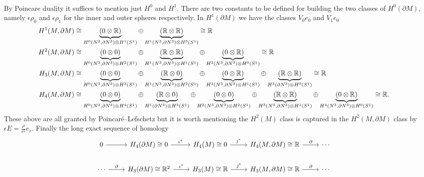 \documentclass{article}
\begin{document}
\begin{example}
\begin{itemize}
\begin{itemize}
\begin{align*}
\end{align*}
By Poincare duality it suffices to mention just $H^0$ and $H^1$. There are two constants to be defined for building the two classes of $H^0(\partial M)$, namely $\epsilon \rho_0$ and $\epsilon \rho_1$ for the inner and outer spheres respectively. In $H^1(\partial M)$ we have the classes $V_0 e_0$ and $V_1 e_0$
\begin{align*}
    H^1(M,\partial M) &\cong \underbrace{(0 \otimes \mathbb{R})}_{H^0(N^3,\partial N^3)\otimes H^1(S^1)} \oplus \underbrace{(\mathbb{R} \otimes \mathbb{R})}_{H^1(N^3,\partial N^3)\otimes H^0(S^1)} \cong \mathbb{R} \\
    H^2(M,\partial M) &\cong \underbrace{(0 \otimes 0)}_{H^0(N^3,\partial N^3)\otimes H^2(S^1)} \oplus \underbrace{(\mathbb{R} \otimes \mathbb{R})}_{H^1(N^3,\partial N^3)\otimes H^1(S^1)} \oplus \underbrace{(0 \otimes \mathbb{R})}_{H^2(N^3,\partial N^3)\otimes H^0(S^1)} \cong \mathbb{R}\\
    H_3(M,\partial M) &\cong \underbrace{(0 \otimes 0)}_{H^0(N^3,\partial N^3)\otimes H^3(S^1)} \oplus \underbrace{(\mathbb{R} \otimes 0)}_{H^1(N^3,\partial N^3)\otimes H^2(S^1)} \oplus \underbrace{(0 \otimes \mathbb{R})}_{H^2(N^3,\partial N^3)\otimes H^1(S^1)} \oplus \underbrace{(\mathbb{R} \otimes \mathbb{R})}_{H^3(\partial N^3)\otimes H^0(S^1)} \cong \mathbb{R}\\
    H_4(M,\partial M) &\cong \underbrace{(0 \otimes 0)}_{H^0(N^3,\partial N^3)\otimes H^4(S^1)} \oplus \underbrace{(\mathbb{R} \otimes 0)}_{H^1(\partial N^3)\otimes H^3(S^1)} \oplus \underbrace{(0 \otimes 0)}_{H^2(N^3,\partial N^3)\otimes H^2(S^1)} \oplus \underbrace{(\mathbb{R} \otimes \mathbb{R})}_{H^3(N^3,\partial N^3)\otimes H^1(S^1)} \oplus \underbrace{(0 \otimes \mathbb{R})}_{H^4(N^3,\partial N^3)\otimes H^0(S^1)} \cong \mathbb{R}.
\end{align*}
These above are all granted by Poincar\'e--Lefschetz but it is worth mentioning the $H^2(M)$ class is captured in the $H^2(M,\partial M)$ class by $\epsilon E = \frac{\rho}{r^2} e_r$. 
Finally the long exact sequence of homology
\[
\begin{tikzcd}
0 \arrow[r]                          & H_4(\partial M)\cong 0 \arrow[r, "\iota^*"]            & H_4(M)\cong 0 \arrow[r, "\jmath^*"]          & {H_4(M,\partial M)\cong \R} \arrow[r, "\partial"]          & \cdots \\
\cdots \arrow[r, "\partial"]                          & H_3(\partial M)\cong \R^2 \arrow[r, "\iota^*"]            & H_3(M)\cong \R \arrow[r, "\jmath^*"]          & {H_3(M,\partial M)\cong \R} \arrow[r, "\partial"]          & \cdots \\

\end{tikzcd}\]
\end{itemize}
\end{itemize}
\end{example}
\end{document}
